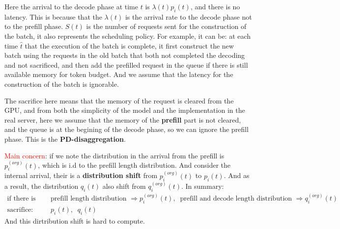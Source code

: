Here the arrival to the decode phase at time $t$ is $\lambda(t)p_i(t)$, and there is no latency. This is because that the $\lambda(t)$ is the arrival rate to the decode phase not to the prefill phase. $S(t)$ is the number of requests sent for the construction of the batch, it also represents the scheduling policy. For example, it can be: at each time $\hat{t}$ that the execution of the batch is complete, it first construct the new batch using the requests in the old batch that both not completed the decoding and not sacrificed, and then add the prefilled request in the queue if there is still available memory for token budget. And we assume that the latency for the construction of the batch is ignorable.

The sacrifice here means that the memory of the request is cleared from the GPU, and from both the simplicity of the model and the implementation in the real server, here we assume that the memory of the \textbf{prefill} part is not cleared, and the queue is at the begining of the decode phase, so we can ignore the prefill phase. This is the \textbf{PD-disaggregation}.

\textcolor{red}{Main concern}: if we note the distribution in the arrival from the prefill is $p_i^{(org)}(t)$, which is i.d to the prefill length distribution. And consider the internal arrival, their is a \textbf{distribution shift} from $p_i^{(org)}(t)$ to $p_i(t)$. And as a result, the distribution $q_i(t)$ also shift from $q_i^{(org)}(t)$. In summary:
\begin{align*}
    \text{if there is no sacrifice: }& \text{prefill length distribution }\Rightarrow p_i^{(org)}(t) ,\; \; \text{prefill and  decode length distribution }\Rightarrow q_i^{(org)}(t)\\
    \text{sacrifice: }& p_i(t) ,\; \; q_i(t)
\end{align*}
And this dirtribution shift is hard to compute.


